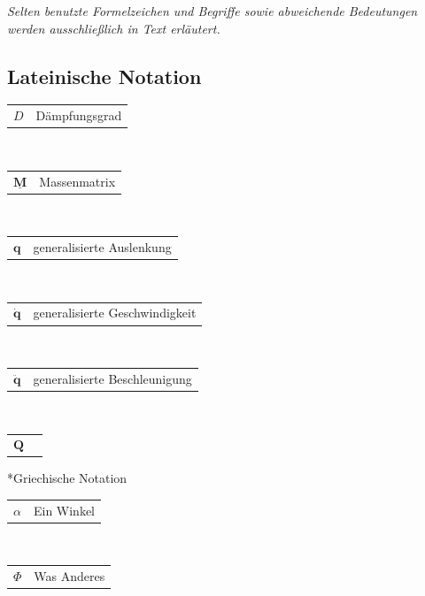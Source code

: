 
\newcommand{\zB}{z.\,B.} %
\newcommand{\uA}{u.\,A.} %
\newcommand{\uU}{u.\,U.}
\newcommand{\dH}{d.\,h.} %

\newcommand{\Matlab}{\textsc{Matlab}}
\newcommand{\Jacobi}{\textsc{Jacobi}}
\newcommand{\Kalman}{\textsc{Kalman}}
\newcommand{\Riccati}{\textsc{Riccati}}
\newcommand{\Pearl}{\textsc{Pearl}}

\newcommand{\abb}[1]{Abb.~\ref{fig:#1}}
\newcommand{\tab}[1]{Tab.~\ref{tab:#1}}
\newcommand{\gl}[1]{Gl.~(\ref{eq:#1})}
\newcommand{\vgl}[1]{vgl. Abschnitt \ref{sec:#1}}

\newcommand{\anmerkung}[1]{\marginpar{\framebox[14mm][c]{\tiny #1}}}
\newcommand{\suchen}{\anmerkung{Lit. suchen!}}
\newcommand{\kommentar}[1]{\texttt{[#1]}}

\newcommand{\inv}{^{-1}}
\newcommand{\Matrix}[2]{\left[\!\!\begin{array}{#1} #2 \end{array}\!\!\right]}
\newcommand{\Vektor}[1]{\Matrix{c}{#1}}

\newcommand{\bs}{\boldsymbol}
\newcommand{\ul}{\underline}
\newcommand{\mgl}{$\,=\,$}
\newcommand{\mapp}{$\,$\approx$\,$}
\newcommand{\einh}[1]{\,\mathrm{#1}}
\newcommand{\komma}{,\!}

\newcommand\declare[2]{
 \begin{tabular}{p{15mm}l}
  $#1$ & #2\\
 \end{tabular}
}
\newcommand\define[3]{
 \newcommand{#1}{#2}
 \declare{#2}{#3}
}
\newcommand\redefine[3]{
 \renewcommand{#1}{#2}
 \declare{#2}{#3}
}

\textit{Selten benutzte Formelzeichen und Begriffe sowie abweichende
Bedeutungen werden ausschließlich in Text erläutert.}

\subsection*{Lateinische Notation}
 \define   {\D}   {D}              {Dämpfungsgrad}\\
 \define   {\M}   {\ul{\bs{M}}}    {Massenmatrix}\\
 \define   {\q}   {\bs{q}}         {generalisierte Auslenkung}\\
 \redefine {\dq}  {\bs{\dot q}}    {generalisierte Geschwindigkeit}\\
 \define   {\ddq} {\bs{\ddot q}}   {generalisierte Beschleunigung}\\
 \define   {\Q}   {\bs{Q}}

\subsection*{Griechische Notation}
 \declare   {\alpha}   {Ein Winkel} \\
 \declare   {\Phi}     {Was Anderes}
